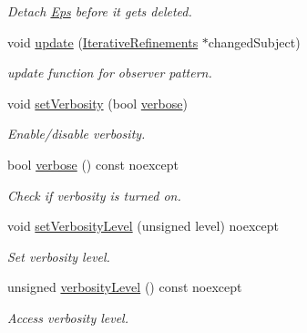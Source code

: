 \begin{DoxyCompactItemize}
\begin{DoxyCompactList}\small\item\em Detach \hyperlink{classSpacy_1_1Mixin_1_1Eps}{Eps} before it gets deleted. \end{DoxyCompactList}\item 
\hypertarget{classSpacy_1_1Mixin_1_1IterativeRefinements_adcb6062728331e48515a05f539628062}{}void \hyperlink{classSpacy_1_1Mixin_1_1IterativeRefinements_adcb6062728331e48515a05f539628062}{update} (\hyperlink{classSpacy_1_1Mixin_1_1IterativeRefinements_a0cdc2228af8fe052680d24fc4bb7ed6a_a0cdc2228af8fe052680d24fc4bb7ed6a}{Iterative\+Refinements} $\ast$changed\+Subject)\label{classSpacy_1_1Mixin_1_1IterativeRefinements_adcb6062728331e48515a05f539628062}

\begin{DoxyCompactList}\small\item\em update function for observer pattern. \end{DoxyCompactList}\item 
void \hyperlink{classSpacy_1_1Mixin_1_1Verbosity_a0365d293ab27e27da9496c668020aefb_a0365d293ab27e27da9496c668020aefb}{set\+Verbosity} (bool \hyperlink{classSpacy_1_1Mixin_1_1Verbosity_ad367a7328578546938fd2a7e52ab3793_ad367a7328578546938fd2a7e52ab3793}{verbose})
\begin{DoxyCompactList}\small\item\em Enable/disable verbosity. \end{DoxyCompactList}\item 
bool \hyperlink{classSpacy_1_1Mixin_1_1Verbosity_ad367a7328578546938fd2a7e52ab3793_ad367a7328578546938fd2a7e52ab3793}{verbose} () const noexcept
\begin{DoxyCompactList}\small\item\em Check if verbosity is turned on. \end{DoxyCompactList}\item 
void \hyperlink{classSpacy_1_1Mixin_1_1Verbosity_af84a4b3c933f252a5840ab63d4a38325_af84a4b3c933f252a5840ab63d4a38325}{set\+Verbosity\+Level} (unsigned level) noexcept
\begin{DoxyCompactList}\small\item\em Set verbosity level. \end{DoxyCompactList}\item 
unsigned \hyperlink{classSpacy_1_1Mixin_1_1Verbosity_a2131f495d276c95d2d6534a6dfce6f9f_a2131f495d276c95d2d6534a6dfce6f9f}{verbosity\+Level} () const noexcept
\begin{DoxyCompactList}\small\item\em Access verbosity level. \end{DoxyCompactList}\item 

\end{DoxyCompactItemize}
